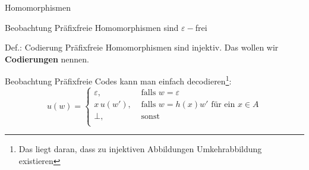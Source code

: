 \begin{frame}{Homomorphismen}
	\begin{exampleblock}{Beobachtung}
		Präfixfreie Homomorphismen sind $\varepsilon-$frei
	\end{exampleblock}

	\begin{block}{Def.: Codierung}
		Präfixfreie Homomorphismen sind injektiv. Das wollen wir \textbf{Codierungen} nennen.
	\end{block}

	\begin{exampleblock}{Beobachtung}
		Präfixfreie Codes kann man einfach decodieren\footnote{Das liegt daran, dass zu injektiven Abbildungen  Umkehrabbildung existieren}:
		\[
		u(w) = 
		\begin{cases}
		\varepsilon, & \text{ falls } w=\varepsilon\\
		x\,u(w'), & \text{ falls } w=h(x)w' \text{ für ein } x\in A \\
		\bot,  & \text{ sonst }\\
		\end{cases}
		\]
	\end{exampleblock}
\end{frame}